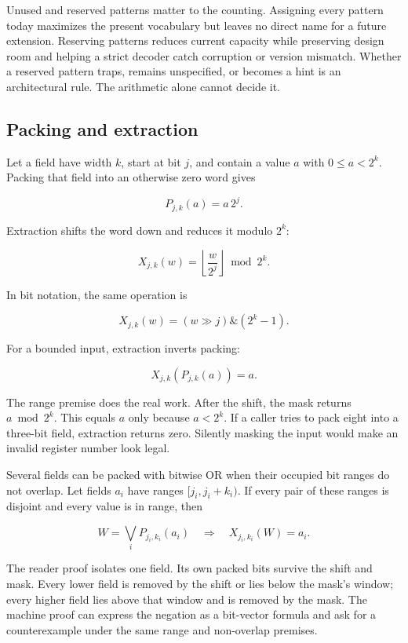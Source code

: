 Unused and reserved patterns matter to the counting. Assigning every pattern
today maximizes the present vocabulary but leaves no direct name for a future
extension. Reserving patterns reduces current capacity while preserving
design room and helping a strict decoder catch corruption or version
mismatch. Whether a reserved pattern traps, remains unspecified, or becomes a
hint is an architectural rule. The arithmetic alone cannot decide it.

\subsection{Packing and extraction}

Let a field have width \(k\), start at bit \(j\), and contain a value \(a\)
with \(0\le a<2^k\). Packing that field into an otherwise zero word gives

\[
  P_{j,k}(a)=a\,2^j.
\]

Extraction shifts the word down and reduces it modulo \(2^k\):

\[
  X_{j,k}(w)=\left\lfloor\frac{w}{2^j}\right\rfloor\bmod 2^k.
\]

In bit notation, the same operation is

\[
  X_{j,k}(w)=(w\mathbin{\gg}j)\mathbin{\&}(2^k-1).
\]

For a bounded input, extraction inverts packing:

\[
  X_{j,k}(P_{j,k}(a))=a.
\]

The range premise does the real work. After the shift, the mask returns
\(a\bmod 2^k\). This equals \(a\) only because \(a<2^k\). If a caller tries to
pack eight into a three-bit field, extraction returns zero. Silently masking
the input would make an invalid register number look legal.

Several fields can be packed with bitwise OR when their occupied bit ranges
do not overlap. Let fields \(a_i\) have ranges
\([j_i,j_i+k_i)\). If every pair of these ranges is disjoint and every value is in
range, then

\[
  W=\bigvee_i P_{j_i,k_i}(a_i)
  \quad\Longrightarrow\quad
  X_{j_i,k_i}(W)=a_i.
\]

The reader proof isolates one field. Its own packed bits survive the shift and
mask. Every lower field is removed by the shift or lies below the mask's
window; every higher field lies above that window and is removed by the mask.
The machine proof can express the negation as a bit-vector formula and ask for
a counterexample under the same range and non-overlap premises.

